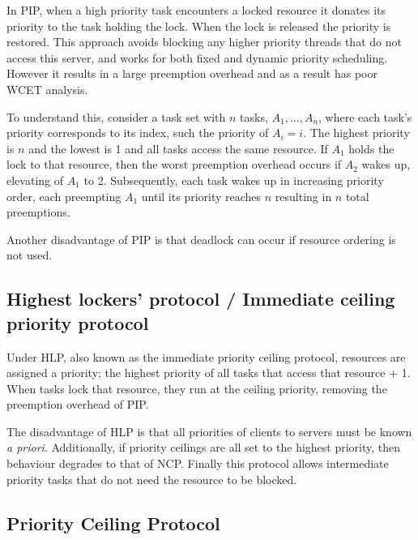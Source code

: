 In \gls{PIP}, when a high priority task encounters a locked resource it donates its priority 
to the task holding the lock. When the lock is released the priority is restored. 
This approach avoids blocking any higher priority threads that do not access this server, and
works for both fixed and dynamic priority scheduling.
However it results in a large preemption overhead and as a result has poor WCET analysis.

To understand this, consider a task set with $n$ tasks, $A_{1}, ... , A_{n}$, where each task's priority
corresponds to its index, such the priority of $A_{i} = i$. The highest priority is $n$ and the
lowest is 1 and all tasks access the same resource. If $A_{1}$ holds the lock to that resource, then
the worst preemption overhead occurs if $A_{2}$ wakes up, elevating of $A_{1}$ to 2. Subsequently,
each task wakes up in increasing priority order, each preempting $A_{1}$ until its priority reaches
$n$ resulting in $n$ total preemptions. 

Another disadvantage of \gls{PIP} is that deadlock can occur if resource ordering is not used.


\subsection{Highest lockers' protocol / Immediate ceiling priority protocol}
\label{sec:hlp}

Under \gls{HLP}, also known as the immediate priority ceiling protocol, resources are assigned a
priority; the highest priority of all tasks that access that resource + 1.  When tasks
lock that resource, they run at the ceiling priority, removing the preemption overhead
of \gls{PIP}.

The disadvantage of \gls{HLP} is that all priorities of clients to servers must be known \emph{a
priori}.  Additionally, if priority ceilings are all set to the highest priority, then behaviour
degrades to that of \gls{NCP}. Finally this protocol allows intermediate priority tasks that do not need
the resource to be blocked. 

\subsection{Priority Ceiling Protocol}

